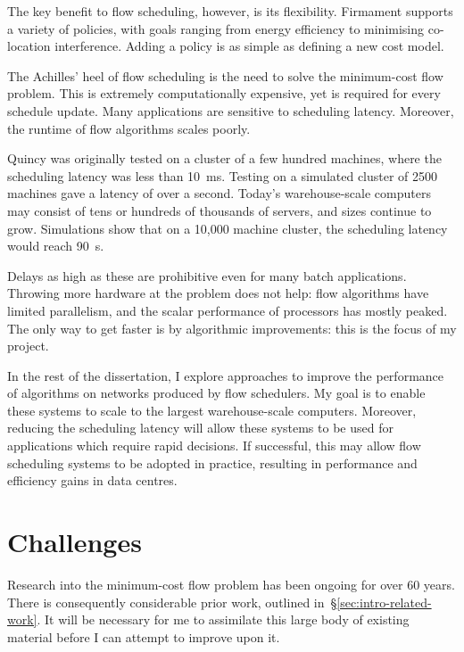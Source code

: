 The key benefit to flow scheduling, however, is its flexibility. Firmament supports a variety of policies, with goals ranging from energy efficiency to minimising co-location interference. Adding a policy is as simple as defining a new cost model.

The Achilles' heel of flow scheduling is the need to solve the minimum-cost flow problem. This is extremely computationally expensive, yet is required for every schedule update. Many applications are sensitive to scheduling latency. Moreover, the runtime of flow algorithms scales poorly. 

Quincy was originally tested on a cluster of a few hundred machines, where the scheduling latency was less than \SI{10}{\milli\second}. Testing on a simulated cluster of 2500 machines gave a latency of over a second. Today's warehouse-scale computers may consist of tens or hundreds of thousands of servers, and sizes continue to grow. Simulations show that on a 10,000 machine cluster, the scheduling latency would reach \SI{90}{\second}.

Delays as high as these are prohibitive even for many batch applications. Throwing more hardware at the problem does not help: flow algorithms have limited parallelism, and the scalar performance of processors has mostly peaked. The only way to get faster is by algorithmic improvements: this is the focus of my project.

In the rest of the dissertation, I explore approaches to improve the performance of algorithms on networks produced by flow schedulers. My goal is to enable these systems to scale to the largest warehouse-scale computers. Moreover, reducing the scheduling latency will allow these systems to be used for applications which require rapid decisions. If successful, this may allow flow scheduling systems to be adopted in practice, resulting in performance and efficiency gains in data centres.

\section{Challenges} \label{sec:intro-challenges}

Research into the minimum-cost flow problem has been ongoing for over 60 years. There is consequently considerable prior work, outlined in~\S\ref{sec:intro-related-work}. It will be necessary for me to assimilate this large body of existing material before I can attempt to improve upon it.

